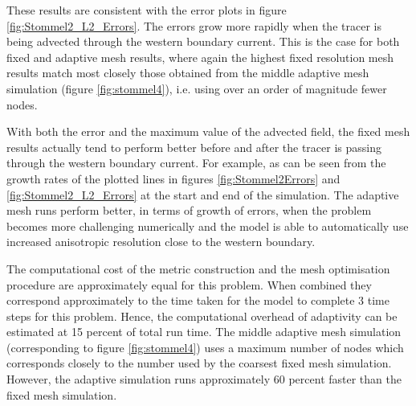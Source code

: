 These results are consistent with the error plots in figure \ref{fig:Stommel2_L2_Errors}.
The errors grow more rapidly when the tracer is being advected through the western boundary current.
This is the case for both fixed and adaptive mesh results, where again the highest fixed resolution
mesh results match most closely those obtained from the middle adaptive mesh simulation (figure \ref{fig:stommel4}),
i.e. using over an order of magnitude fewer nodes.

With both the \Ltwo error and the maximum value of the advected field, the fixed mesh results
actually tend to perform better before and after the tracer is passing through the western boundary current.
For example, as can be seen from the growth rates of the plotted lines in figures \ref{fig:Stommel2Errors} and \ref{fig:Stommel2_L2_Errors}
 at the start and end of the simulation. The adaptive mesh runs perform better, in terms of
growth of errors, when the problem becomes more challenging numerically and the model is able to automatically use
increased anisotropic resolution close to the western boundary.


The computational cost of the metric construction and the mesh optimisation procedure are approximately
equal for this problem. When combined they correspond approximately to the time taken for the model
to complete 3 time steps for this problem. Hence, the computational overhead of adaptivity can be estimated
at 15 percent of total run time. The middle adaptive mesh simulation (corresponding to figure \ref{fig:stommel4})
uses a maximum number of nodes which corresponds closely to the number used by the coarsest fixed mesh simulation.
However, the adaptive simulation runs approximately 60 percent faster than the fixed mesh simulation.



